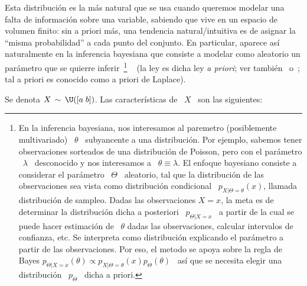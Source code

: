 \label{Sssec:MP:UniformeContinua}

Esta distribuci\'on es  la m\'as natural que se usa  cuando queremos modelar una
falta de  informaci\'on sobre una variable,  sabiendo que vive en  un espacio de
volumen  finito: sin  a  priori  m\'as, una  tendencia  natural/intuitiva es  de
asignar la  ``misma probabilidad''  a cada punto  del conjunto.   En particular,
aparece as\'i  naturalmente en  la inferencia bayesiana  que consiste  a modelar
como aleatorio un par\'ametro  que se quierre inferir~\footnote{En la inferencia
  bayesiana, nos interesamos al paremetro (posiblemente multivariado) \ $\theta$
  \ subyancente  a una distribuci\'on. Por ejemplo,  sabemos tener observaciones
  sorteados  de  una  distribuci\'on  de  Poisson, pero  con  el  par\'ametro  \
  $\lambda$ \  desconocido y  nos interesamos a  \ $\theta \equiv  \lambda$.  El
  enfoque bayesiano consiste a considerar el par\'ametro \ $\Theta$ \ aleatorio,
  tal que la  distribuci\'on de las observaciones sea  vista como distribuci\'on
  condicional \  $p_{X|\Theta = \theta}(x)$, llamada  distribuci\'on de sampleo.
  Dadas las  observaciones $X = x$,  la meta es de  determinar la distribuci\'on
  dicha a posteriori \  $p_{\Theta|X = x}$ \ a partir de  la cual se puede hacer
  estimaci\'on  de \ $\theta$  dadas las  observaciones, calcular  intervalos de
  confianza, etc. Se interpreta  como distribuci\'on explicando el par\'ametro a
  partir de  las observaciones.  Por eso, el  metodo se apoya sobre  la regla de
  Bayes $p_{\Theta|X=x}(\theta) \propto p_{X|\Theta=\theta}(x) p_\Theta(\theta)$
  \  as\'i que  se necesita  elegir una  distribuci\'on \  $p_\Theta$ \  dicha a
  priori.\label{Foot:MP:BayesPrior} }
~\cite{Rob07} (la  ley es dicha  ley {\em a priori};  ver tambi\'en~\cite{Bay63}
o~\cite{Lap20}; tal a priori es conocido como a priori de Laplace).

Se denota $X \, \sim \, \U([a \; b])$. Las caracter\'isticas de \ $X$ \ son las
siguientes:


